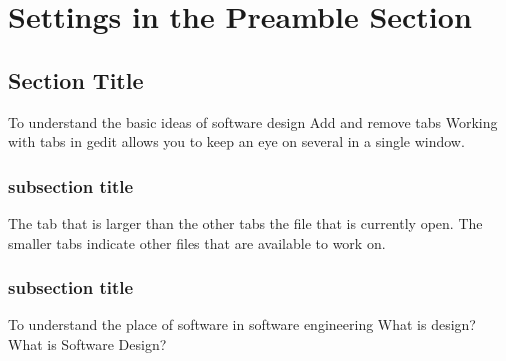 \chapter{Settings in the Preamble Section} 

\label{AppendixA} 



\section{Section Title}
To understand the basic ideas of software design Add and remove tabs Working with tabs in gedit allows you to keep an eye on several  in a single window. 

\subsection{subsection title}
The tab that is larger than the other tabs  the file that is currently open. The smaller tabs indicate other files that are available to work on. 

\subsection{subsection title}
To understand the place of software in software engineering What is design? What is Software Design? 

